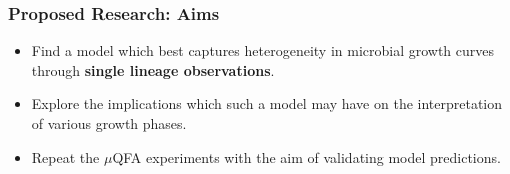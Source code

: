 \documentclass{beamer}
\begin{document}
\begin{frame}
\frametitle{Proposed Research: Aims}
\begin{itemize}
\item Find a model which best captures heterogeneity in microbial growth curves through \textbf{single lineage observations}.
\item Explore the implications which such a model may have on the interpretation of various growth phases.
\item Repeat the $\mu$QFA experiments with the aim of validating model predictions.
\end{itemize}
\begin{center}
\end{center}
\end{frame}
\end{document}
